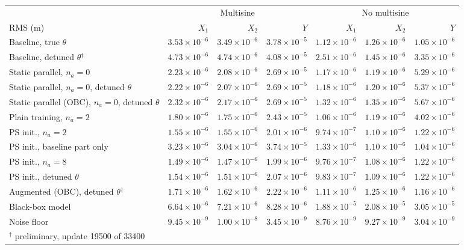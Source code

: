 \setlength{\tabcolsep}{3pt}
\begin{tabular}{l r r r r r r}
\toprule
 & \multicolumn{3}{c}{Multisine} & \multicolumn{3}{c}{No multisine}\\
\cmidrule(lr){2-4}\cmidrule(lr){5-7}
RMS (m) & $X_1$ & $X_2$ & $Y$ & $X_1$ & $X_2$ & $Y$\\
\midrule
Baseline, true $\theta$ & $3.53\times10^{-6}$ & $3.49\times10^{-6}$ & $3.78\times10^{-5}$ & $1.12\times10^{-6}$ & $1.26\times10^{-6}$ & $1.05\times10^{-6}$\\
Baseline, detuned $\theta$$^\dagger$ & $4.73\times10^{-6}$ & $4.74\times10^{-6}$ & $4.08\times10^{-5}$ & $2.51\times10^{-6}$ & $1.45\times10^{-6}$ & $3.35\times10^{-6}$\\
Static parallel, $n_a{=}0$ & $2.23\times10^{-6}$ & $2.08\times10^{-6}$ & $2.69\times10^{-5}$ & $1.17\times10^{-6}$ & $1.19\times10^{-6}$ & $5.29\times10^{-6}$\\
Static parallel, $n_a{=}0$, detuned $\theta$ & $2.22\times10^{-6}$ & $2.07\times10^{-6}$ & $2.69\times10^{-5}$ & $1.18\times10^{-6}$ & $1.20\times10^{-6}$ & $5.37\times10^{-6}$\\
Static parallel (OBC), $n_a{=}0$, detuned $\theta$ & $2.32\times10^{-6}$ & $2.17\times10^{-6}$ & $2.69\times10^{-5}$ & $1.32\times10^{-6}$ & $1.35\times10^{-6}$ & $5.67\times10^{-6}$\\
Plain training, $n_a{=}2$ & $1.80\times10^{-6}$ & $1.75\times10^{-6}$ & $2.43\times10^{-5}$ & $1.06\times10^{-6}$ & $1.19\times10^{-6}$ & $4.02\times10^{-6}$\\
PS init., $n_a{=}2$ & $1.55\times10^{-6}$ & $1.55\times10^{-6}$ & $2.01\times10^{-6}$ & $9.74\times10^{-7}$ & $1.10\times10^{-6}$ & $1.22\times10^{-6}$\\
PS init., baseline part only & $3.23\times10^{-6}$ & $3.04\times10^{-6}$ & $3.74\times10^{-5}$ & $1.33\times10^{-6}$ & $1.10\times10^{-6}$ & $1.04\times10^{-6}$\\
PS init., $n_a{=}8$ & $1.49\times10^{-6}$ & $1.47\times10^{-6}$ & $1.99\times10^{-6}$ & $9.76\times10^{-7}$ & $1.08\times10^{-6}$ & $1.22\times10^{-6}$\\
PS init., detuned $\theta$ & $1.54\times10^{-6}$ & $1.51\times10^{-6}$ & $2.07\times10^{-6}$ & $9.83\times10^{-7}$ & $1.09\times10^{-6}$ & $1.22\times10^{-6}$\\
\midrule
Augmented (OBC), detuned $\theta$$^\dagger$ & $1.71\times10^{-6}$ & $1.62\times10^{-6}$ & $2.22\times10^{-6}$ & $1.11\times10^{-6}$ & $1.25\times10^{-6}$ & $1.16\times10^{-6}$\\
\midrule
Black-box model & $6.64\times10^{-6}$ & $7.21\times10^{-6}$ & $8.28\times10^{-6}$ & $1.88\times10^{-5}$ & $2.08\times10^{-5}$ & $3.05\times10^{-5}$\\
\midrule
Noise floor & $9.45\times10^{-9}$ & $1.00\times10^{-8}$ & $3.45\times10^{-9}$ & $8.76\times10^{-9}$ & $9.27\times10^{-9}$ & $3.04\times10^{-9}$\\
\bottomrule
\multicolumn{7}{l}{\footnotesize $^\dagger$ preliminary, update 19500 of 33400}\\
\end{tabular}
